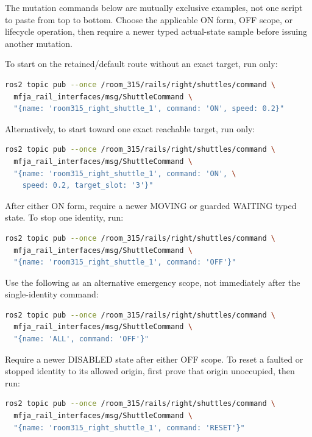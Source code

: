 The mutation commands below are mutually exclusive examples, not one script to
paste from top to bottom. Choose the applicable ON form, OFF scope, or lifecycle
operation, then require a newer typed actual-state sample before issuing another
mutation.

To start on the retained/default route without an exact target, run only:

\begin{lstlisting}[language=bash]
ros2 topic pub --once /room_315/rails/right/shuttles/command \
  mfja_rail_interfaces/msg/ShuttleCommand \
  "{name: 'room315_right_shuttle_1', command: 'ON', speed: 0.2}"
\end{lstlisting}

Alternatively, to start toward one exact reachable target, run only:

\begin{lstlisting}[language=bash]
ros2 topic pub --once /room_315/rails/right/shuttles/command \
  mfja_rail_interfaces/msg/ShuttleCommand \
  "{name: 'room315_right_shuttle_1', command: 'ON', \
    speed: 0.2, target_slot: '3'}"
\end{lstlisting}

After either ON form, require a newer MOVING or guarded WAITING typed state.
To stop one identity, run:

\begin{lstlisting}[language=bash]
ros2 topic pub --once /room_315/rails/right/shuttles/command \
  mfja_rail_interfaces/msg/ShuttleCommand \
  "{name: 'room315_right_shuttle_1', command: 'OFF'}"
\end{lstlisting}

Use the following as an alternative emergency scope, not immediately after the
single-identity command:

\begin{lstlisting}[language=bash]
ros2 topic pub --once /room_315/rails/right/shuttles/command \
  mfja_rail_interfaces/msg/ShuttleCommand \
  "{name: 'ALL', command: 'OFF'}"
\end{lstlisting}

Require a newer DISABLED state after either OFF scope. To reset a faulted or
stopped identity to its allowed origin, first prove that origin unoccupied,
then run:

\begin{lstlisting}[language=bash]
ros2 topic pub --once /room_315/rails/right/shuttles/command \
  mfja_rail_interfaces/msg/ShuttleCommand \
  "{name: 'room315_right_shuttle_1', command: 'RESET'}"
\end{lstlisting}

